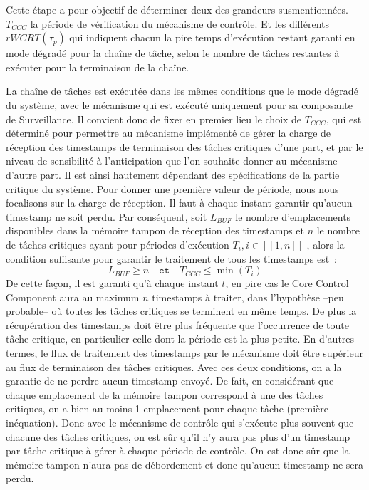 \documentclass[french, a4paper, 11pt, twoside, pdftex]{StyleThese}
\begin{document}
    		Cette étape a pour objectif de déterminer deux des grandeurs susmentionnées. $T_{CCC}$ la période de vérification du mécanisme de contrôle. Et les différents $rWCRT(\tau_p)$ qui indiquent chacun la pire temps d'exécution restant garanti en mode dégradé pour la chaîne de tâche, selon le nombre de tâches restantes à exécuter pour la terminaison de la chaîne. 
    		
    		La chaîne de tâches est exécutée dans les mêmes conditions que le mode dégradé du système, avec le mécanisme qui est exécuté uniquement pour sa composante de Surveillance. Il convient donc de fixer en premier lieu le choix de $T_{CCC}$, qui est déterminé pour permettre au mécanisme implémenté de gérer la charge de réception des timestamps de terminaison des tâches critiques d'une part, et par le niveau de sensibilité à l'anticipation que l'on souhaite donner au mécanisme d'autre part. Il est ainsi hautement dépendant des spécifications de la partie critique du système. 
    		Pour donner une première valeur de période, nous nous focalisons sur la charge de réception. Il faut à chaque instant garantir qu'aucun timestamp ne soit perdu. Par conséquent, soit $L_{BUF}$ le nombre d'emplacements disponibles dans la mémoire tampon de réception des timestamps et $n$ le nombre de tâches critiques ayant pour périodes d'exécution $T_i, i \in [\![1,n]\!]$ , alors la condition suffisante pour garantir le traitement de tous les timestamps est~:
    		\begin{equation}\label{eq:conditionsMemoireControle}
    			L_{BUF} \geq n  \quad \texttt{et} \quad T_{CCC} \leq \min{(T_i)}
    		\end{equation}
    		De cette façon, il est garanti qu'à chaque instant $t$, en pire cas le Core Control Component aura au maximum $n$ timestamps à traiter, dans l'hypothèse --peu probable-- où toutes les tâches critiques se terminent en même temps. 
    		De plus la récupération des timestamps doit être plus fréquente que l'occurrence de toute tâche critique, en particulier celle dont la période est la plus petite. En d'autres termes, le flux de traitement des timestamps par le mécanisme doit être supérieur au flux de terminaison des tâches critiques. 
    		Avec ces deux conditions, on a la garantie de ne perdre aucun timestamp envoyé. De fait, en considérant que chaque emplacement de la mémoire tampon correspond à une des tâches critiques, on a bien au moins 1 emplacement pour chaque tâche (première inéquation). Donc avec le mécanisme de contrôle qui s'exécute plus souvent que chacune des tâches critiques, on est sûr qu'il n'y aura pas plus d'un timestamp par tâche critique à gérer à chaque période de contrôle. On est donc sûr que la mémoire tampon n'aura pas de débordement et donc qu'aucun timestamp ne sera perdu. 
    		
\end{document}
